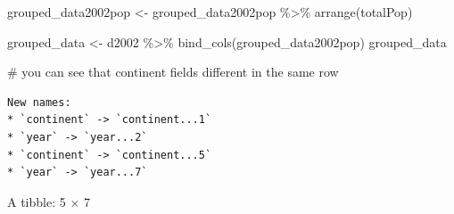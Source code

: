 \documentclass[
  letterpaper,
  DIV=11,
  numbers=noendperiod]{scrreprt}
\newenvironment{Shaded}{\begin{snugshade}}{\end{snugshade}}
\newcommand{\CommentTok}[1]{\textcolor[rgb]{0.37,0.37,0.37}{#1}}
\newcommand{\FunctionTok}[1]{\textcolor[rgb]{0.28,0.35,0.67}{#1}}
\newcommand{\NormalTok}[1]{\textcolor[rgb]{0.00,0.23,0.31}{#1}}
\newcommand{\OtherTok}[1]{\textcolor[rgb]{0.00,0.23,0.31}{#1}}
\newcommand{\SpecialCharTok}[1]{\textcolor[rgb]{0.37,0.37,0.37}{#1}}
\begin{document}
\begin{Shaded}
\begin{Highlighting}[]
\NormalTok{grouped\_data2002pop }\OtherTok{\textless{}{-}}\NormalTok{ grouped\_data2002pop }\SpecialCharTok{\%\textgreater{}\%} 
    \FunctionTok{arrange}\NormalTok{(totalPop)}

\NormalTok{grouped\_data }\OtherTok{\textless{}{-}}\NormalTok{ d2002 }\SpecialCharTok{\%\textgreater{}\%} 
    \FunctionTok{bind\_cols}\NormalTok{(grouped\_data2002pop)}
\NormalTok{grouped\_data}

\CommentTok{\# you can see that continent fields different in the same row}
\end{Highlighting}
\end{Shaded}

\begin{verbatim}
New names:
* `continent` -> `continent...1`
* `year` -> `year...2`
* `continent` -> `continent...5`
* `year` -> `year...7`
\end{verbatim}

A tibble: 5 × 7
\end{document}
